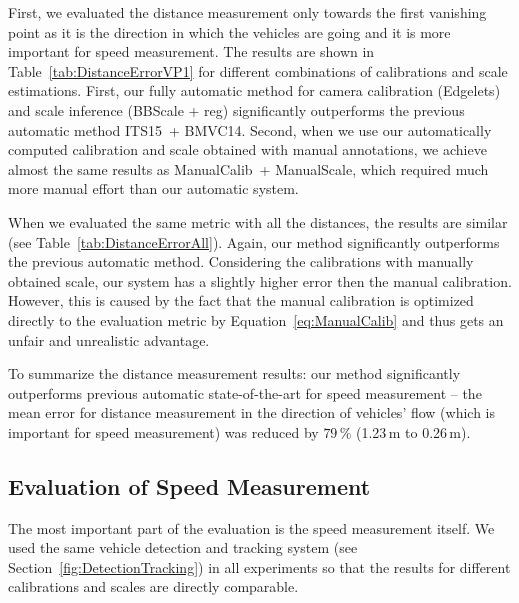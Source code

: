 \documentclass[]{elsarticle}
\newcommand{\ITSCalib}{ITS15}
\newcommand{\EdgeLetsCalib}{Edgelets}
\newcommand{\ManualCalib}{ManualCalib}
\newcommand{\BMVCScale}{BMVC14}
\newcommand{\BBScaleReg}{BBScale + reg}
\newcommand{\ManualScale}{ManualScale}
\begin{document}
First, we evaluated the distance measurement only towards the first vanishing point as it is the direction in which the vehicles are going and it is more important for speed measurement. 
The results are shown in Table~\ref{tab:DistanceErrorVP1} for different combinations of calibrations and scale estimations. First, our fully automatic method for camera calibration (\EdgeLetsCalib) and scale inference (\BBScaleReg) significantly outperforms the previous automatic method \ITSCalib\ + \BMVCScale.
Second, when we use our automatically computed calibration and scale obtained with manual annotations, we achieve almost the same results as \ManualCalib\ + \ManualScale, which required much more manual effort than our automatic system.

When we evaluated the same metric with all the distances, the results are similar (see Table~\ref{tab:DistanceErrorAll}). Again, our method significantly outperforms the previous automatic method. Considering the calibrations with manually obtained scale, our system has a slightly higher error then the manual calibration. However, this is caused by the fact that the manual calibration is optimized directly to the evaluation metric by Equation~\eqref{eq:ManualCalib} and thus gets an unfair and unrealistic advantage.

To summarize the distance measurement results: our method significantly outperforms previous automatic state-of-the-art for speed measurement -- the mean error for distance measurement in the direction of vehicles' flow (which is important for speed measurement) was reduced by $79\,\%$ (1.23\,m to 0.26\,m). 



\subsection{Evaluation of Speed Measurement} \label{sec:SpeedMeasurementEval}
The most important part of the evaluation is the speed measurement itself. We used the same vehicle detection and tracking system (see Section~\ref{fig:DetectionTracking}) in all experiments so that the results for different calibrations and scales are directly comparable.
\end{document}
